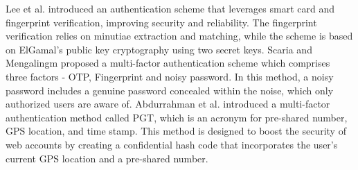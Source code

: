 \documentclass[10pt,journal,compsoc]{IEEEtran}
\begin{document}
      \par Lee et al. \cite{IEEEtran40} introduced an authentication scheme that leverages smart card and fingerprint verification, improving security and reliability. The fingerprint verification relies on minutiae extraction and matching, while the scheme is based on ElGamal's public key cryptography using two secret keys. Scaria and Mengalingm \cite{IEEEtran51} proposed a multi-factor authentication scheme which comprises three factors - OTP, Fingerprint and noisy password. In this method, a noisy password includes a genuine password concealed within the noise, which only authorized users are aware of. Abdurrahman et al. \cite{IEEEtran30}  introduced a multi-factor authentication method called PGT, which is an acronym for pre-shared number, GPS location, and time stamp. This method is designed to boost the security of web accounts by creating a confidential hash code that incorporates the user's current GPS location and a pre-shared number.
\end{document}

